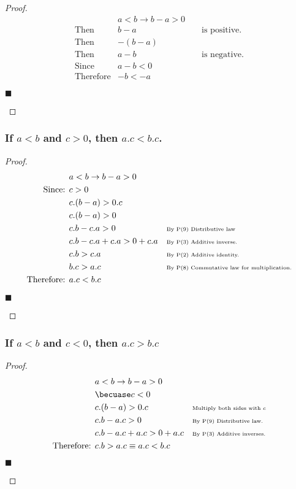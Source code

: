 \documentclass[letterpaper, 10 pt, conference]{ieeeconf}  %
\begin{document}
\begin{proof}
\begin{align}
    &a < b \rightarrow b - a > 0 &&\\
    \text{Then } &b - a &&\text{ is positive.} \\
    \text{Then } &-(b - a) &&\\
    \text{Then } &a - b&& \text{ is negative.} \\
    \text{Since } & a - b < 0 && \\
    \text{Therefore} & -b < -a &&
\end{align}
\begin{flushright}
$\blacksquare$
\end{flushright}
\end{proof}

\subsubsection{\textbf{If $a < b$ and $c > 0$, then $a.c < b.c$.}}
\begin{proof}
\begin{align}
    &a < b \rightarrow b - a > 0 &&\\
    \text{Since: } & c > 0 && \\
    & c.(b - a) > 0.c && \\
    & c.(b - a) > 0 && \\
    & c.b - c.a > 0 && \text{\tiny{By P(9) Distributive law}}\\
    & c.b - c.a + c.a > 0 + c.a && \text{\tiny{By P(3) Additive inverse.}}\\
    & c.b > c.a && \text{\tiny{By P(2) Additive identity.}}\\
    &b.c > a.c && \text{\tiny{By P(8) Commutative law for multiplication.}} \\
    \text{Therefore: } & a.c < b.c&&
\end{align}
\begin{flushright}
$\blacksquare$
\end{flushright}
\end{proof}

\subsubsection{\textbf{If $a < b$ and $c < 0$, then $a.c > b.c$}}

\begin{proof}
\begin{align}
    &a < b \rightarrow b - a > 0 &&\\
    &\becuase c < 0 && \\
    & c.(b - a) > 0.c && \text{\tiny{Multiply both sides with $c$}} \\
    & c.b - a.c > 0 && \text{\tiny{By P(9) Distributive law.}}\\
    & c.b - a.c + a.c > 0 + a.c && \text{\tiny{By P(3) Additive inverses.}}\\
    \text{Therefore: }& c.b > a.c \equiv a.c < b.c &&
\end{align}
\begin{flushright}
$\blacksquare$
\end{flushright}
\end{proof}
\end{document}

